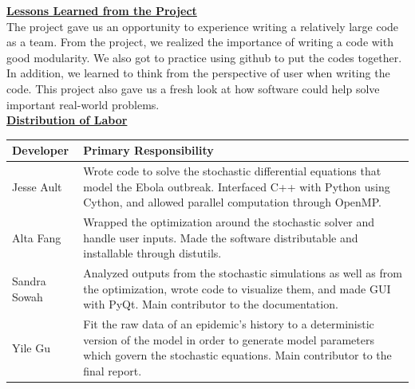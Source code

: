 \documentclass[11pt,letter]{article}
\begin{document}



\underline{\textbf{Lessons Learned from the Project}}\vspace{0.5mm}\\

The project gave us an opportunity to experience writing a relatively large code as a team. From the project, we realized the importance of writing a code with good modularity. We also got to practice using github to put the codes together. In addition, we learned to think from the perspective of user when writing the code. This project also gave us a fresh look at how software could help solve important real-world problems. \\


\underline{\textbf{Distribution of Labor}}\vspace{0.5mm}\\
\begin{center}
	\begin{tabular}{ l | p{13cm}}
           Developer & Primary Responsibility \\ \hline
	Jesse Ault & Wrote code to solve the stochastic differential equations that model the Ebola outbreak. Interfaced C++ with Python using Cython, and allowed parallel computation through OpenMP. \\
	Alta Fang & Wrapped the optimization around the stochastic solver and handle user inputs. Made the software distributable and installable through distutils. \\
	Sandra Sowah & Analyzed outputs from the stochastic simulations as well as from the optimization, wrote code to visualize them, and made GUI with PyQt. Main contributor to the documentation.\\
	Yile Gu & Fit the raw data of an epidemic's history to a deterministic version of the model in order to generate model parameters which govern the stochastic equations. Main contributor to the final report.
	\end{tabular}
\end{center}
\end{document}
